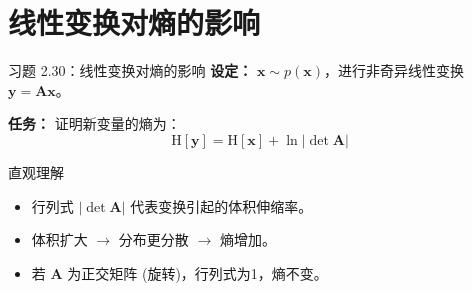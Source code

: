 \documentclass[12pt, aspectratio=169]{beamer}
\begin{document}
\section{线性变换对熵的影响}
\begin{frame}{习题 2.30：线性变换对熵的影响}
    \textbf{设定：}
    $\mathbf{x} \sim p(\mathbf{x})$，进行非奇异线性变换 $\mathbf{y}=\mathbf{A} \mathbf{x}$。
    
    \textbf{任务：}
    证明新变量的熵为：
    \begin{equation}
        \mathrm{H}[\mathbf{y}]=\mathrm{H}[\mathbf{x}]+\ln | \operatorname{det} \mathbf{A} |
    \end{equation}
    
    \begin{block}{直观理解}
        \begin{itemize}
            \item 行列式 $|\det \mathbf{A}|$ 代表变换引起的体积伸缩率。
            \item 体积扩大 $\rightarrow$ 分布更分散 $\rightarrow$ 熵增加。
            \item 若 $\mathbf{A}$ 为正交矩阵 (旋转)，行列式为1，熵不变。
        \end{itemize}
    \end{block}
\end{frame}
\end{document}
